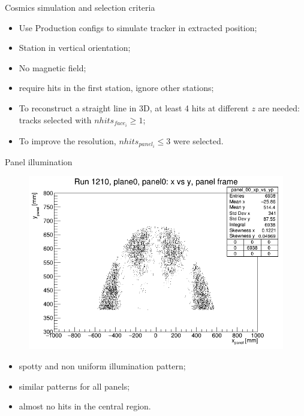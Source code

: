 \documentclass{beamer}[10pt]
\begin{document}
\begin{frame}{Cosmics simulation and selection criteria}
  \begin{itemize}
    \item Use Production configs to simulate tracker in extracted position;
    \vspace{3mm}
    \item Station in vertical orientation;
    \vspace{3mm}
    \item No magnetic field;
    \vspace{3mm}
    \item  require hits in the first station, ignore other stations;
    \vspace{3mm}
    \item To reconstruct a straight line in 3D, at least 4 hits at different $z$ are needed: tracks selected with $nhits_{face_i}\geq 1$;
    \vspace{3mm}
    \item To improve the resolution, $nhits_{panel_i}\leq 3$ were selected.
  \end{itemize}
\end{frame}



\begin{frame}{Panel illumination}
   \vspace{-3mm}
            \begin{figure}[H]
                \centering
                \includegraphics[width=0.7 \textwidth]{figures/pdf/xp_vs_yp_panel0.png}
                \label{fig:enter-label}
            \end{figure}
\begin{itemize}
  \item spotty and non uniform illumination pattern;
    \item similar patterns for all panels;
  \item almost no hits in the central region.
\end{itemize}

\end{frame}
\end{document}
